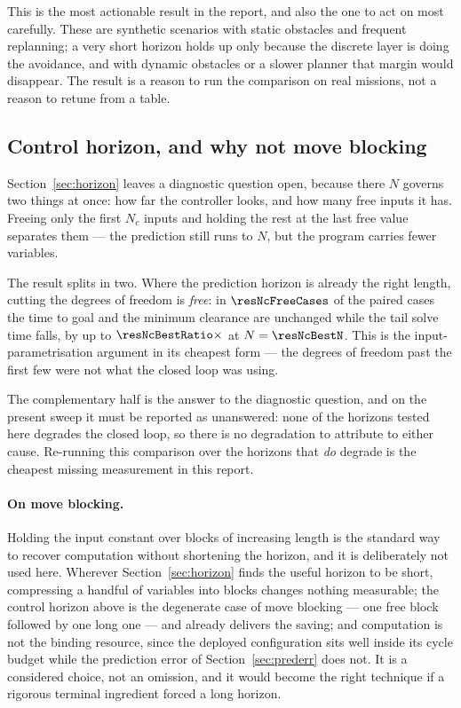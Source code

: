 \documentclass[11pt,a4paper]{article}
\newcommand{\Ninput}{N_c}
\begin{document}
This is the most actionable result in the report, and also the one to act on most carefully. These are
synthetic scenarios with static obstacles and frequent replanning; a very short horizon holds up only because
the discrete layer is doing the avoidance, and with dynamic obstacles or a slower planner that margin would
disappear. The result is a reason to run the comparison on real missions, not a reason to retune from a
table.

\subsection{Control horizon, and why not move blocking}
\label{sec:nc}

Section~\ref{sec:horizon} leaves a diagnostic question open, because there $N$ governs two things at once:
how far the controller looks, and how many free inputs it has. Freeing only the first $\Ninput$ inputs and
holding the rest at the last free value separates them --- the prediction still runs to $N$, but the program
carries fewer variables.


The result splits in two. Where the prediction horizon is already the right length, cutting the degrees of
freedom is \emph{free}: in $\resNcFreeCases$ of the paired cases the time to goal and the minimum clearance
are unchanged while the tail solve time falls, by up to $\resNcBestRatio\times$ at $N=\resNcBestN$. This is
the input-parametrisation argument in its cheapest form --- the degrees of freedom past the first few were
not what the closed loop was using.

The complementary half is the answer to the diagnostic question, and on the present sweep it must be reported
as unanswered: none of the horizons tested here degrades the closed loop, so there is no degradation to
attribute to either cause. Re-running this comparison over the horizons that \emph{do} degrade is the
cheapest missing measurement in this report.

\paragraph{On move blocking.} Holding the input constant over blocks of increasing length is the standard way
to recover computation without shortening the horizon, and it is deliberately not used here. Wherever
Section~\ref{sec:horizon} finds the useful horizon to be short, compressing a handful of variables into
blocks changes nothing measurable; the control horizon above is the degenerate case of move blocking --- one
free block followed by one long one --- and already delivers the saving; and computation is not the binding
resource, since the deployed configuration sits well inside its cycle budget while the prediction error of
Section~\ref{sec:prederr} does not. It is a considered choice, not an omission, and it would become the right
technique if a rigorous terminal ingredient forced a long horizon.
\end{document}
